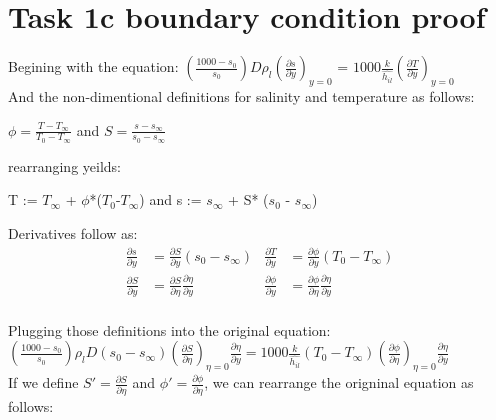 \documentclass[letterpaper, 10pt]{article}
\begin{document}
	\section*{Task 1c boundary condition proof} %
	\label{sec:Task 1c}
	Begining with the equation: $\left( \frac{1000-s_0}{s_0} \right) D \rho_l \left( \frac{\partial s}{\partial y} \right)_{y = 0}$ = $1000 \frac{k}{\hat{h_{il}}}  \left (\frac{\partial T}{\partial y} \right)_{y = 0}$\\

	\noindent And the non-dimentional definitions for salinity and temperature as follows:\\
	\begin{center}
		$\phi = \frac{T-T_\infty}{T_0-T_\infty}$ and $S = \frac{s - s_\infty}{s_0 - s_\infty}$
	\end{center}

	\noindent rearranging yeilds:\\
	\begin{center}
		T := $T_\infty$ + $\phi$*($T_0$-$T_\infty$) and s := $s_\infty $ + S* ($s_0$ - $s_\infty $)
	\end{center}

	\noindent Derivatives follow as:\\
	\begin{align*}
		\frac{\partial s}{\partial y} &= \frac{\partial S}{\partial y}(s_0 - s_\infty) & 		\frac{\partial T}{\partial y} &= \frac{\partial \phi}{\partial y}(T_0 - T_\infty)\\
		\frac{\partial S}{\partial y} &=  \frac{\partial S}{\partial \eta}  \frac{\partial \eta}{\partial y} & \frac{\partial \phi}{\partial y} &=  \frac{\partial \phi}{\partial \eta}\frac{\partial \eta}{\partial y}\\
	\end{align*}

	\noindent Plugging those definitions into the original equation:\\
	$\left(\frac{1000 - s_0}{s_0}\right) \rho_l D (s_0 - s_\infty) \left(\frac{\partial S}{\partial \eta}\right)_{\eta = 0} \frac{\partial \eta}{\partial y} = 1000 \frac{k}{\hat{h_{il}}} (T_0 - T_\infty) \left(\frac{\partial \phi}{\partial \eta}\right)_{\eta = 0}\frac{\partial \eta}{\partial y}$\\

	\noindent If we define $S' = \frac{\partial S}{\partial \eta} $ and $ \phi ' = \frac{\partial \phi}{\partial \eta}$, we can rearrange the origninal equation as follows:\\
\end{document}
